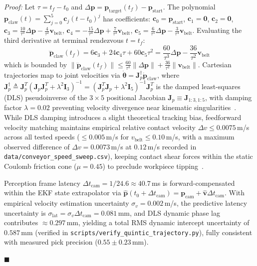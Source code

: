 \documentclass[journal]{IEEEtran}
\newenvironment{proof}{\noindent\textit{Proof: }}{\hfill$\blacksquare$\vspace{1.5mm}}
\begin{document}
\begin{proof}
Let $\tau = t_f - t_0$ and $\Delta\mathbf{p} = \mathbf{p}_{\text{target}}(t_f) - \mathbf{p}_{\text{start}}$. The polynomial $\mathbf{p}_{\text{claw}}(t) = \sum_{j=0}^5 \mathbf{c}_j (t - t_0)^j$ has coefficients:
$\mathbf{c}_0 = \mathbf{p}_{\text{start}}$, $\mathbf{c}_1 = \mathbf{0}$, $\mathbf{c}_2 = \mathbf{0}$,
$\mathbf{c}_3 = \frac{10}{\tau^3}\Delta\mathbf{p} - \frac{4}{\tau^2}\mathbf{v}_{\text{belt}}$,
$\mathbf{c}_4 = -\frac{15}{\tau^4}\Delta\mathbf{p} + \frac{7}{\tau^3}\mathbf{v}_{\text{belt}}$,
$\mathbf{c}_5 = \frac{6}{\tau^5}\Delta\mathbf{p} - \frac{3}{\tau^4}\mathbf{v}_{\text{belt}}$.
Evaluating the third derivative at terminal rendezvous $t = t_f$:
\begin{equation}
\dddot{\mathbf{p}}_{\text{claw}}(t_f) = 6\mathbf{c}_3 + 24\mathbf{c}_4\tau + 60\mathbf{c}_5\tau^2 = \frac{60}{\tau^3}\Delta\mathbf{p} - \frac{36}{\tau^2}\mathbf{v}_{\text{belt}}
\end{equation}
which is bounded by $\|\dddot{\mathbf{p}}_{\text{claw}}(t_f)\| \le \frac{60}{\tau^3}\|\Delta\mathbf{p}\| + \frac{36}{\tau^2}\|\mathbf{v}_{\text{belt}}\|$. Cartesian trajectories map to joint velocities via $\dot{\boldsymbol{\theta}} = \mathbf{J}_p^\dagger \dot{\mathbf{p}}_{\text{claw}}$, where $\mathbf{J}_p^\dagger \triangleq \mathbf{J}_p^T (\mathbf{J}_p\mathbf{J}_p^T + \lambda^2 \mathbf{I}_3)^{-1} = (\mathbf{J}_p^T\mathbf{J}_p + \lambda^2 \mathbf{I}_5)^{-1}\mathbf{J}_p^T$ is the damped least-squares (DLS) pseudoinverse of the $3 \times 5$ positional Jacobian $\mathbf{J}_p \equiv \mathbf{J}_{1:3, 1:5}$, with damping factor $\lambda = 0.02$ preventing velocity divergence near kinematic singularities~\cite{lynch2017modern,craig2005introduction}. While DLS damping introduces a slight theoretical tracking bias, feedforward velocity matching maintains empirical relative contact velocity $\Delta v \le 0.0075$\,m/s across all tested speeds ($\le 0.005$\,m/s for $v_{\text{belt}} \le 0.10$\,m/s, with a maximum observed difference of $\Delta v = 0.0073$\,m/s at $0.12$\,m/s recorded in \texttt{data/conveyor\_speed\_sweep.csv}), keeping contact shear forces within the static Coulomb friction cone ($\mu = 0.45$) to preclude workpiece tipping~\cite{mason2001mechanics,aria_base_sun2022moving}.

Perception frame latency $\Delta t_{\text{cam}} = 1/24.6 \approx 40.7$\,ms is forward-compensated within the EKF state extrapolator via $\hat{\mathbf{p}}(t_0 + \Delta t_{\text{cam}}) = \mathbf{p}_{\text{cam}} + \hat{\mathbf{v}}\Delta t_{\text{cam}}$. With empirical velocity estimation uncertainty $\sigma_v = 0.002$\,m/s, the predictive latency uncertainty is $\sigma_{\text{lat}} = \sigma_v \Delta t_{\text{cam}} = 0.081$\,mm, and DLS dynamic phase lag contributes $\approx 0.297$\,mm, yielding a total RMS dynamic intercept uncertainty of $0.587$\,mm (verified in \texttt{scripts/verify\_quintic\_trajectory.py}), fully consistent with measured pick precision ($0.55 \pm 0.23$\,mm).


\end{proof}
\end{document}
